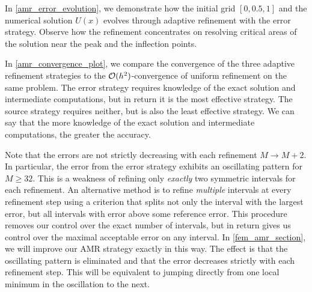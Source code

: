
In \cref{amr_error_evolution}, we demonstrate how the initial grid $[0, 0.5, 1]$ and the numerical solution $U(x)$ evolves through adaptive refinement with the error strategy.
Observe how the refinement concentrates on resolving critical areas of the solution near the peak and the inflection points.

In \cref{amr_convergence_plot}, we compare the convergence of the three adaptive refinement strategies to the $\mathcal{O}(h^2)$-convergence of uniform refinement on the same problem.
The error strategy requires knowledge of the exact solution and intermediate computations, but in return it is the most effective strategy.
The source strategy requires neither, but is also the least effective strategy.
We can say that the more knowledge of the exact solution and intermediate computations, the greater the accuracy.

Note that the errors are not strictly decreasing with each refinement $M \rightarrow M+2$.
In particular, the error from the error strategy exhibits an oscillating pattern for $M \geq 32$.
This is a weakness of refining only \emph{exactly} two symmetric intervals for each refinement.
An alternative method is to refine \emph{multiple} intervals at every refinement step using a criterion that splits not only the interval with the largest error, but all intervals with error above some reference error.
This procedure removes our control over the exact number of intervals, but in return gives us control over the maximal acceptable error on any interval.
In \cref{fem_amr_section}, we will improve our AMR strategy exactly in this way.
The effect is that the oscillating pattern is eliminated and that the error decreases strictly with each refinement step.
This will be equivalent to jumping directly from one local minimum in the oscillation to the next.

